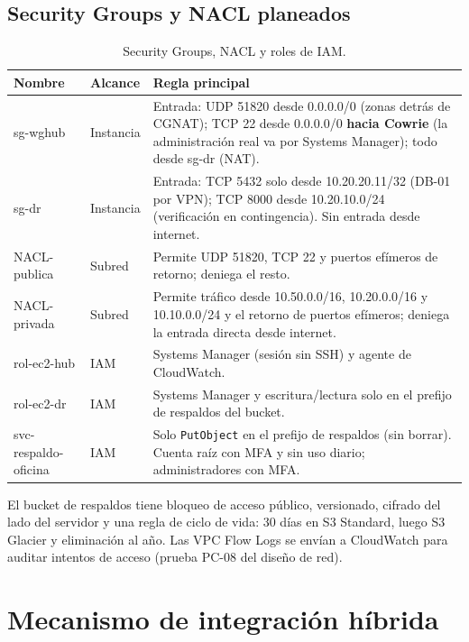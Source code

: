 \subsection{Security Groups y NACL planeados}

\begin{table}[H]
\centering
\caption{Security Groups, NACL y roles de IAM.}
\label{tab:ce03-sg}
\small
\begin{tabularx}{\textwidth}{L{2.4cm}L{1.6cm}X}
\toprule
\textbf{Nombre} & \textbf{Alcance} & \textbf{Regla principal} \\
\midrule
sg-wghub & Instancia & Entrada: UDP 51820 desde 0.0.0.0/0 (zonas detrás de CGNAT); TCP 22 desde 0.0.0.0/0 \textbf{hacia Cowrie} (la administración real va por Systems Manager); todo desde sg-dr (NAT). \\
sg-dr & Instancia & Entrada: TCP 5432 solo desde 10.20.20.11/32 (DB-01 por VPN); TCP 8000 desde 10.20.10.0/24 (verificación en contingencia). Sin entrada desde internet. \\
NACL-publica & Subred & Permite UDP 51820, TCP 22 y puertos efímeros de retorno; deniega el resto. \\
NACL-privada & Subred & Permite tráfico desde 10.50.0.0/16, 10.20.0.0/16 y 10.10.0.0/24 y el retorno de puertos efímeros; deniega la entrada directa desde internet. \\
rol-ec2-hub & IAM & Systems Manager (sesión sin SSH) y agente de CloudWatch. \\
rol-ec2-dr & IAM & Systems Manager y escritura/lectura solo en el prefijo de respaldos del bucket. \\
svc-respaldo-oficina & IAM & Solo \texttt{PutObject} en el prefijo de respaldos (sin borrar). Cuenta raíz con MFA y sin uso diario; administradores con MFA. \\
\bottomrule
\end{tabularx}
\end{table}

\noindent El bucket de respaldos tiene bloqueo de acceso público, versionado, cifrado
del lado del servidor y una regla de ciclo de vida: 30 días en S3 Standard, luego S3
Glacier y eliminación al año. Las VPC Flow Logs se envían a CloudWatch para auditar
intentos de acceso (prueba PC-08 del diseño de red).

\section{Mecanismo de integración híbrida}

